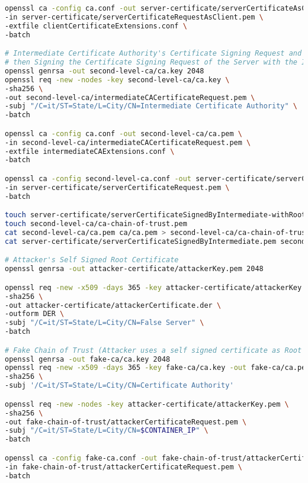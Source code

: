 \documentclass[binding=0.6cm,noexaminfo]{sapthesis}
\begin{document}
\begin{lstlisting}[language=Bash]
openssl ca -config ca.conf -out server-certificate/serverCertificateAsClient.pem \
-in server-certificate/serverCertificateRequestAsClient.pem \
-extfile clientCertificateExtensions.conf \
-batch

# Intermediate Certificate Authority's Certificate Signing Request and Root CA Signing of it,
# then Signing the Certificate Signing Request of the Server with the Intermediate Certificate
openssl genrsa -out second-level-ca/ca.key 2048
openssl req -new -nodes -key second-level-ca/ca.key \
-sha256 \
-out second-level-ca/intermediateCACertificateRequest.pem \
-subj "/C=it/ST=State/L=City/CN=Intermediate Certificate Authority" \
-batch

openssl ca -config ca.conf -out second-level-ca/ca.pem \
-in second-level-ca/intermediateCACertificateRequest.pem \
-extfile intermediateCAExtensions.conf \
-batch

openssl ca -config second-level-ca.conf -out server-certificate/serverCertificateSignedByIntermediate.pem \
-in server-certificate/serverCertificateRequest.pem \
-batch

touch server-certificate/serverCertificateSignedByIntermediate-withRootCAIntegrated.pem
touch second-level-ca/ca-chain-of-trust.pem
cat second-level-ca/ca.pem ca/ca.pem > second-level-ca/ca-chain-of-trust.pem
cat server-certificate/serverCertificateSignedByIntermediate.pem second-level-ca/ca-chain-of-trust.pem > server-certificate/serverCertificateSignedByIntermediate-withRootCAIntegrated.pem

# Attacker's Self Signed Root Certificate
openssl genrsa -out attacker-certificate/attackerKey.pem 2048

openssl req -new -x509 -days 365 -key attacker-certificate/attackerKey.pem \
-sha256 \
-out attacker-certificate/attackerCertificate.der \
-outform DER \
-subj "/C=it/ST=State/L=City/CN=False Server" \
-batch

# Fake Chain of Trust (Attacker uses a self signed certificate as Root Certificate Authority)
openssl genrsa -out fake-ca/ca.key 2048
openssl req -new -x509 -days 365 -key fake-ca/ca.key -out fake-ca/ca.pem \
-sha256 \
-subj '/C=it/ST=State/L=City/CN=Certificate Authority'

openssl req -new -nodes -key attacker-certificate/attackerKey.pem \
-sha256 \
-out fake-chain-of-trust/attackerCertificateRequest.pem \
-subj "/C=it/ST=State/L=City/CN=$CONTAINER_IP" \
-batch

openssl ca -config fake-ca.conf -out fake-chain-of-trust/attackerCertificate.pem \
-in fake-chain-of-trust/attackerCertificateRequest.pem \
-batch


\end{lstlisting}
\end{document}
